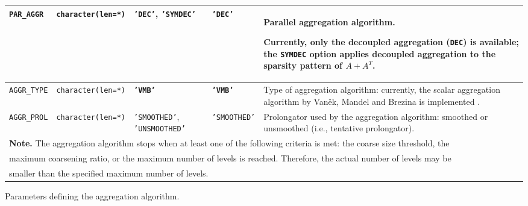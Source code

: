 \begin{center}
\begin{tabular}{|p{3.9cm}|l|p{2.3cm}|p{2.9cm}|p{6.9cm}|}
\verb|PAR_AGGR|  & \verb|character(len=*)| \hspace*{-3mm}
                         & \texttt{'DEC'}, \texttt{'SYMDEC'}
                         & \texttt{'DEC'}
                         & Parallel aggregation algorithm. \par Currently, only the
                         decoupled aggregation (\verb|DEC|) is available; the
                           \verb|SYMDEC| option  applies decoupled
                           aggregation to  the sparsity pattern
                           of $A+A^T$.\\ \hline
\verb|AGGR_TYPE|  & \verb|character(len=*)| \hspace*{-3mm}
                         & \textbf{\texttt{'VMB'}} & \textbf{\texttt{'VMB'}}   
                         & Type of aggregation algorithm: currently, the scalar aggregation
                             algorithm by Van\v{e}k, Mandel and Brezina is implemented
                             \cite{VANEK_MANDEL_BREZINA}. \\ \hline
\verb|AGGR_PROL|  & \verb|character(len=*)| \hspace*{-3mm}
                         & \texttt{'SMOOTHED'}, \texttt{'UNSMOOTHED'} & \texttt{'SMOOTHED'}
                         & Prolongator used by the aggregation algorithm: smoothed or unsmoothed
                         (i.e., tentative prolongator). \\
\hline
\multicolumn{5}{|l|}{{\bfseries Note.} The aggregation algorithm stops when
at least one of the following criteria is met: 
the coarse size threshold, the} \\
\multicolumn{5}{|l|}{maximum coarsening ratio, or the maximum number
of levels is reached. Therefore, the actual number of levels may be} \\
\multicolumn{5}{|l|}{smaller than the specified maximum number
of levels. } \\
\hline
\end{tabular}
\end{center}
\caption{Parameters defining the aggregation algorithm.
\label{tab:p_aggregation}} 
\esideways


